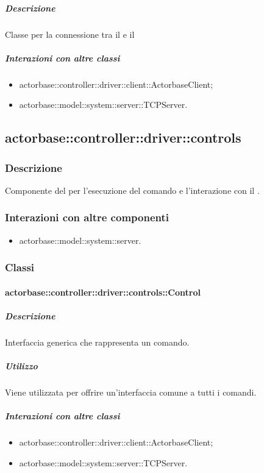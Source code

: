 \documentclass{scalatekids-article}
\begin{document}
\subparagraph{Descrizione}

Classe per la connessione tra il  e il 

\subparagraph{Interazioni con altre classi}
\begin{itemize}
\item actorbase::controller::driver::client::ActorbaseClient;
\item actorbase::model::system::server::TCPServer.
\end{itemize}

\subsection{actorbase::controller::driver::controls}

\subsubsection{Descrizione}

Componente del  per l'esecuzione del comando e l'interazione
con il .

\subsubsection{Interazioni con altre componenti}

\begin{itemize}
\item actorbase::model::system::server.
\end{itemize}

\subsubsection{Classi}

\paragraph{actorbase::controller::driver::controls::Control}

\subparagraph{Descrizione}

Interfaccia generica che rappresenta un comando.

\subparagraph{Utilizzo}

Viene utilizzata per offrire un'interfaccia comune a tutti i comandi.

\subparagraph{Interazioni con altre classi}

\begin{itemize}
\item actorbase::controller::driver::client::ActorbaseClient;
\item actorbase::model::system::server::TCPServer.
\end{itemize}
\end{document}
